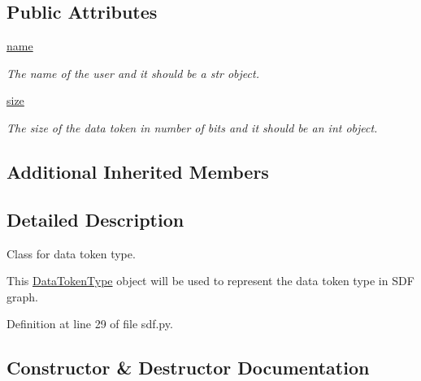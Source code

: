 \subsection*{Public Attributes}
\begin{DoxyCompactItemize}
\item 
\hyperlink{classsylva_1_1base_1_1sdf_1_1_data_token_type_a64214bba14fcba747fd608caef007924}{name}
\begin{DoxyCompactList}\small\item\em The name of the user and it should be a str object. \end{DoxyCompactList}\item 
\hyperlink{classsylva_1_1base_1_1sdf_1_1_data_token_type_abf397c07db4eced64bf773de13fcbbf0}{size}
\begin{DoxyCompactList}\small\item\em The size of the data token in number of bits and it should be an int object. \end{DoxyCompactList}\end{DoxyCompactItemize}
\subsection*{Additional Inherited Members}


\subsection{Detailed Description}
Class for data token type. 

This \hyperlink{classsylva_1_1base_1_1sdf_1_1_data_token_type}{Data\+Token\+Type} object will be used to represent the data token type in S\+DF graph. 

Definition at line 29 of file sdf.\+py.



\subsection{Constructor \& Destructor Documentation}
\mbox{\label{classsylva_1_1base_1_1sdf_1_1_data_token_type_a66ffd0baf50eee248190857d5d4793ec}} 
